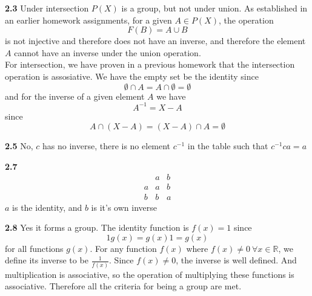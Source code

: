 \documentclass[12pt]{article}
\newenvironment{ques}{\vspace{2 ex}}{\vspace{2 ex}}
\theoremstyle{definition}
\begin{document}
\begin{ques}
	\textbf{2.3}
	Under intersection $P(X)$ is a group, but not under union. As
		established in an earlier homework assignments, for a given $A
		\in P(X)$, the operation 
		$$F(B) = A \cup B$$
		is not injective and therefore does not have an inverse, and
		therefore the element $A$ cannot have an inverse under the
		union operation.\\
		For intersection, we have proven in a previous homework that
		the intersection operation is assosiative. We have the empty
		set be the identity since
		$$\emptyset \cap A = A \cap \emptyset = \emptyset$$
		and for the inverse of a given element $A$ we have 
		$$A^{-1} = X - A$$
		since 
		$$A \cap (X - A) = (X - A) \cap A = \emptyset$$

\end{ques}

\begin{ques}
	\textbf{2.5}
		No, $c$ has no inverse, there is no element $c^{-1}$ in the
		table such that $c^{-1} c a = a$
\end{ques}

\begin{ques}
	\textbf{2.7}
	$$\begin{array}{c|cc}
			& a & b \\
			\hline
			a & a & b \\
			b & b & a
		\end{array}$$
	$a$ is the identity, and $b$ is it's own inverse
\end{ques}

\begin{ques}
	\textbf{2.8}
		Yes it forms a group. The identity function is $f(x) = 1$ since 
		$$1g(x) = g(x)1 = g(x)$$
		for all functions $g(x)$. For any function $f(x)$ where $f(x)
		\neq 0 \ \forall x \in \mathbb{R}$, we define its inverse to be
		$\frac1{f(x)}$. Since $f(x) \neq 0$, the inverse is well
		defined. And multiplication is associative, so the operation of
		multiplying these functions is associative. Therefore all the
		criteria for being a group are met.
\end{ques}
\end{document}
